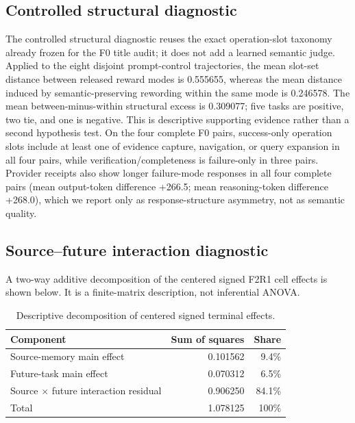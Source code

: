 \subsection{Controlled structural diagnostic}
The controlled structural diagnostic reuses the exact operation-slot taxonomy already frozen for the F0 title audit; it does not add a learned semantic judge. Applied to the eight disjoint prompt-control trajectories, the mean slot-set distance between released reward modes is 0.555655, whereas the mean distance induced by semantic-preserving rewording within the same mode is 0.246578. The mean between-minus-within structural excess is 0.309077; five tasks are positive, two tie, and one is negative. This is descriptive supporting evidence rather than a second hypothesis test. On the four complete F0 pairs, success-only operation slots include at least one of evidence capture, navigation, or query expansion in all four pairs, while verification/completeness is failure-only in three pairs. Provider receipts also show longer failure-mode responses in all four complete pairs (mean output-token difference +266.5; mean reasoning-token difference +268.0), which we report only as response-structure asymmetry, not as semantic quality.

\subsection{Source--future interaction diagnostic}
A two-way additive decomposition of the centered signed F2R1 cell effects is shown below. It is a finite-matrix description, not inferential ANOVA.
\begin{table}[h]
\centering
\small
\caption{Descriptive decomposition of centered signed terminal effects.}
\begin{tabular}{lrr}
\toprule
Component & Sum of squares & Share \\
\midrule
Source-memory main effect & 0.101562 & 9.4\% \\
Future-task main effect & 0.070312 & 6.5\% \\
Source $\times$ future interaction residual & 0.906250 & 84.1\% \\
\midrule
Total & 1.078125 & 100\% \\
\bottomrule
\end{tabular}
\end{table}

